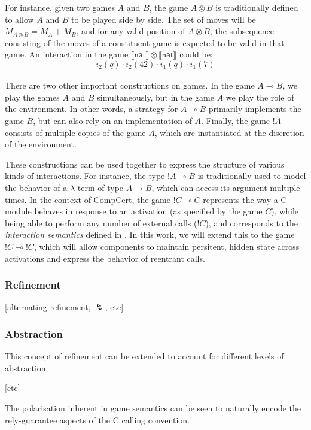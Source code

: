 \documentclass{article}
\newcommand{\kw}[1]{\ensuremath{ \mathsf{#1} }}
\begin{document}
For instance,
given two games $A$ and $B$,
the game $A \otimes B$ is traditionally defined
to allow $A$ and $B$ to be played side by side.
The set of moves will be $M_{A \otimes B} = M_A + M_B$,
and for any valid position of $A \otimes B$,
the subsequence consisting of the moves of a constituent game
is expected to be valid in that game.
An interaction in the game
$\llbracket \kw{nat} \rrbracket \otimes
 \llbracket \kw{nat} \rrbracket$ could be:
\[ i_2(q) \cdot \underline{i_2(42)} \cdot
   i_1(q) \cdot \underline{i_1(7)} \]

There are two other important constructions on games.
In the game $A \multimap B$,
we play the games $A$ and $B$ simultaneously,
but in the game $A$ we play the role of the environment.
In other words,
a strategy for $A \multimap B$
primarily implements the game $B$,
but can also rely on an implementation of $A$.
Finally,
the game $!A$
consists of multiple copies of the game $A$,
which are instantiated at the discretion of the environment.

These constructions can be used together
to express the structure of various kinds of interactions.
For instance,
the type $!A \multimap B$ is traditionally used
to model the behavior of a $\lambda$-term of type $A \rightarrow B$,
which can access its argument multiple times.
In the context of CompCert,
the game $!C \multimap C$
represents the way a C module behaves in response to an activation
(as specified by the game $C$),
while being able to perform any number of external calls ($!C$),
and corresponds to the \emph{interaction semantics} defined in
\cite{compcompcert}.
In this work,
we will extend this to the game $!C \multimap !C$,
which will allow components to maintain
persitent, hidden state across activations
and express the behavior of reentrant calls.

\subsubsection{Refinement}

[alternating refinement, $\lightning$, etc]

\subsubsection{Abstraction}

This concept of refinement can be extended to account for
different levels of abstraction.


[etc]

The polarisation inherent in game semantics
can be seen to naturally encode the rely-guarantee aspects
of the C calling convention.
\end{document}
